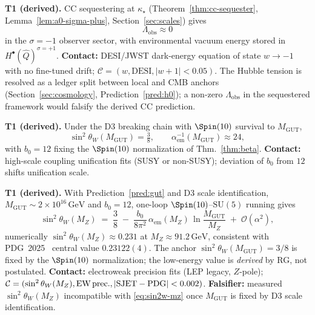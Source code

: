 \begin{prediction}\label{pred:cc}
\textbf{T1 (derived).} CC sequestering at $\kappa_\star$
(Theorem~\ref{thm:cc-sequester}, Lemma~\ref{lem:a0-sigma-plus},
Section~\ref{sec:scales}) gives
\begin{equation}\label{eq:Lambda-obs}
  \Lambda_{\mathrm{obs}}\approx 0
\end{equation}
in the $\sigma=-1$ observer sector, with environmental vacuum energy stored in
$H^\bullet(\hat Q)^{\sigma=+1}$.
\textbf{Contact:} DESI/JWST dark-energy equation of state
$w\to -1$ with no fine-tuned drift; $\mathcal{C}=(w,\mathrm{DESI},|w+1|<0.05)$.
The Hubble tension is resolved as a ledger split between local and CMB
anchors (Section~\ref{sec:cosmology}, Prediction~\ref{pred:h0}); a non-zero
$\Lambda_{\mathrm{obs}}$ in the sequestered framework would falsify the
derived CC prediction.
\end{prediction}

\begin{prediction}\label{pred:gut}
\textbf{T1 (derived).} Under the D3 breaking chain with $\Spin(10)$ survival
to $M_{\mathrm{GUT}}$,
\begin{equation}\label{eq:sin2w}
  \sin^2\theta_W(M_{\mathrm{GUT}})=\tfrac38,
  \qquad
  \alpha_{\mathrm{em}}^{-1}(M_{\mathrm{GUT}})\approx 24,
\end{equation}
with $b_0=12$ fixing the $\Spin(10)$ normalization of Thm.~\ref{thm:beta}.
\textbf{Contact:} high-scale coupling unification fits (SUSY or non-SUSY);
deviation of $b_0$ from $12$ shifts unification scale.
\end{prediction}

\begin{prediction}\label{pred:sin2w-mz}
\textbf{T1 (derived).} With Prediction~\ref{pred:gut} and D3 scale identification,
$M_{\mathrm{GUT}}\sim 2\times 10^{16}\,\mathrm{GeV}$ and $b_0=12$, one-loop
$\Spin(10)$--$\mathrm{SU}(5)$ running gives
\begin{equation}\label{eq:sin2w-mz}
  \sin^2\theta_W(M_Z)
  \;=\;
  \frac38
  \;-\;
  \frac{b_0}{8\pi^2}\,\alpha_{\mathrm{em}}(M_Z)\,
  \ln\!\frac{M_{\mathrm{GUT}}}{M_Z}
  \;+\;\mathcal{O}(\alpha^2),
\end{equation}
numerically $\sin^2\theta_W(M_Z)\approx 0.231$ at $M_Z\approx 91.2\,\mathrm{GeV}$,
consistent with PDG~2025~\cite{PDG2025} central value
$0.23122(4)$. The anchor $\sin^2\theta_W(M_{\mathrm{GUT}})=3/8$ is fixed by
the $\Spin(10)$ normalization; the low-energy value is \emph{derived} by RG,
not postulated.
\textbf{Contact:} electroweak precision fits (LEP legacy, $Z$-pole);
$\mathcal{C}=(\sin^2\theta_W(M_Z),\mathrm{EW\,prec.},|{\rm SJET}-{\rm PDG}|<0.002)$.
\textbf{Falsifier:} measured $\sin^2\theta_W(M_Z)$ incompatible with
\eqref{eq:sin2w-mz} once $M_{\mathrm{GUT}}$ is fixed by D3 scale identification.
\end{prediction}

